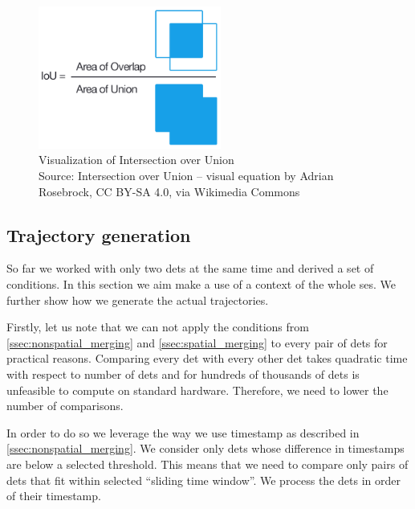\begin{figure}
    \centering
    \includegraphics[width=6cm]{img/Intersection_over_Union_-_visual_equation.png}
    \caption[Visualization of Intersection over Union]{Visualization of Intersection over Union\\Source: Intersection over Union -- visual equation\protect\footnotemark{} by Adrian Rosebrock, CC BY-SA 4.0,\footnotemark{} via Wikimedia Commons}
    \label{fig:iou}
\end{figure}
\addtocounter{footnote}{-2}


\subsection{Trajectory generation}

\label{ssec:trajectory_generation}

So far we worked with only two \glspl{det} at the same time and derived a set of conditions. In this section we aim make a use of a context of the whole \gls{ses}. We further show how we generate the actual trajectories.

Firstly, let us note that we can not apply the conditions from \autoref{ssec:nonspatial_merging} and \autoref{ssec:spatial_merging} to every pair of \glspl{det} for practical reasons. Comparing every \gls{det} with every other \gls{det} takes quadratic time with respect to number of \glspl{det} and for hundreds of thousands of \glspl{det} is unfeasible to compute on standard hardware. Therefore, we need to lower the number of comparisons.

In order to do so we leverage the way we use timestamp as described in \autoref{ssec:nonspatial_merging}. We consider only \glspl{det} whose difference in timestamps are below a selected threshold. This means that we need to compare only pairs of \glspl{det} that fit within selected ``sliding time window''. We process the \glspl{det} in order of their timestamp.

